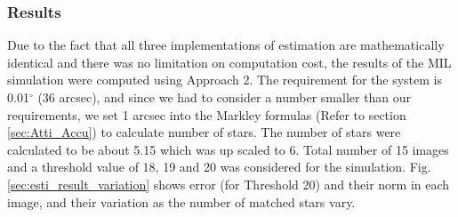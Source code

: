 \documentclass[../../main.tex]{subfiles}
\begin{document}
{{{}


\subsubsection{Results}
{
Due to the fact that all three implementations of estimation are mathematically identical and there was no limitation on computation cost, the results of the MIL simulation were computed using Approach 2. The requirement for the system is 0.01$^\circ$ (36 arcsec), and since we had to consider a number smaller than our requirements, we set 1 arcsec into the Markley formulas (Refer to section \ref{sec:Atti_Accu}) to calculate number of stars. The number of stars were calculated to be about 5.15 which was up scaled to 6. Total number of 15 images and a threshold value of 18, 19 and 20 was considered for the simulation. Fig. \ref{sec:esti_result_variation} shows error (for Threshold 20) and their norm in each image, and their variation as the number of matched stars vary.

}}}
\end{document}
